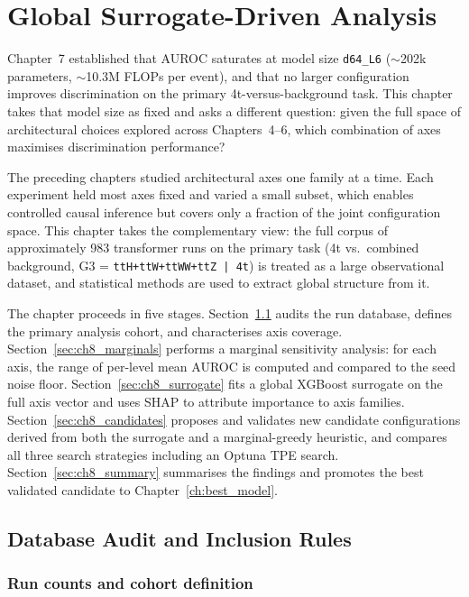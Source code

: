 \chapter{Global Surrogate-Driven Analysis}
\label{ch:global_surrogate}

Chapter~7 established that AUROC saturates at model size \texttt{d64\_L6}
($\sim$202k parameters, $\sim$10.3M FLOPs per event), and that no larger
configuration improves discrimination on the primary 4t-versus-background task.
This chapter takes that model size as fixed and asks a different question: given
the full space of architectural choices explored across Chapters~4--6, which
combination of axes maximises discrimination performance?

The preceding chapters studied architectural axes one family at a time.
Each experiment held most axes fixed and varied a small subset, which
enables controlled causal inference but covers only a fraction of the
joint configuration space. This chapter takes the complementary view:
the full corpus of approximately 983 transformer runs on the primary task
(4t vs.\ combined background, G3 = \texttt{ttH+ttW+ttWW+ttZ | 4t}) is
treated as a large observational dataset, and statistical methods are used
to extract global structure from it.

The chapter proceeds in five stages. Section~\ref{sec:ch8_audit} audits
the run database, defines the primary analysis cohort, and characterises
axis coverage. Section~\ref{sec:ch8_marginals} performs a marginal
sensitivity analysis: for each axis, the range of per-level mean AUROC
is computed and compared to the seed noise floor. Section~\ref{sec:ch8_surrogate}
fits a global XGBoost surrogate on the full axis vector and uses SHAP to
attribute importance to axis families. Section~\ref{sec:ch8_candidates}
proposes and validates new candidate configurations derived from both the
surrogate and a marginal-greedy heuristic, and compares all three search
strategies including an Optuna TPE search. Section~\ref{sec:ch8_summary}
summarises the findings and promotes the best validated candidate to
Chapter~\ref{ch:best_model}.

\section{Database Audit and Inclusion Rules}
\label{sec:ch8_audit}

\subsection{Run counts and cohort definition}

